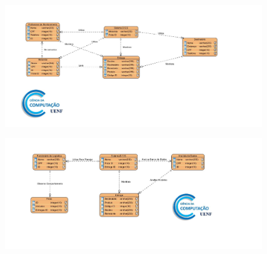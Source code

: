 	\begin{figure}[H]
		\centering
		\includegraphics[width=1.2\linewidth]{Pictures/ER1}
		\caption{}
		\label{fig:er1}
	\end{figure}

	
	\begin{figure}[H]
		\centering
		\includegraphics[width=1.2\linewidth]{Pictures/ER2}
		\caption{}
		\label{fig:er2}
	\end{figure}

